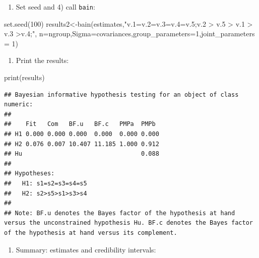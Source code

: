 \documentclass[
]{book}
\newenvironment{Shaded}{\begin{snugshade}}{\end{snugshade}}
\newcommand{\AttributeTok}[1]{\textcolor[rgb]{0.77,0.63,0.00}{#1}}
\newcommand{\DecValTok}[1]{\textcolor[rgb]{0.00,0.00,0.81}{#1}}
\newcommand{\FunctionTok}[1]{\textcolor[rgb]{0.00,0.00,0.00}{#1}}
\newcommand{\NormalTok}[1]{#1}
\newcommand{\OtherTok}[1]{\textcolor[rgb]{0.56,0.35,0.01}{#1}}
\newcommand{\StringTok}[1]{\textcolor[rgb]{0.31,0.60,0.02}{#1}}
\providecommand{\tightlist}{%
  \setlength{\itemsep}{0pt}\setlength{\parskip}{0pt}}
\begin{document}
\begin{enumerate}
\def\labelenumi{\arabic{enumi})}
\setcounter{enumi}{2}
\tightlist
\item
  Set seed and 4) call \texttt{bain}:
\end{enumerate}

\begin{Shaded}
\begin{Highlighting}[]
\FunctionTok{set.seed}\NormalTok{(}\DecValTok{100}\NormalTok{)}
\NormalTok{results2}\OtherTok{\textless{}{-}}\FunctionTok{bain}\NormalTok{(estimates,}\StringTok{"v.1=v.2=v.3=v.4=v.5;v.2 \textgreater{} v.5 \textgreater{} v.1 \textgreater{} v.3 \textgreater{}v.4;"}\NormalTok{,}
\AttributeTok{n=}\NormalTok{ngroup,}\AttributeTok{Sigma=}\NormalTok{covariances,}\AttributeTok{group\_parameters=}\DecValTok{1}\NormalTok{,}\AttributeTok{joint\_parameters =} \DecValTok{1}\NormalTok{)}
\end{Highlighting}
\end{Shaded}

\begin{enumerate}
\def\labelenumi{\arabic{enumi})}
\setcounter{enumi}{4}
\tightlist
\item
  Print the results:
\end{enumerate}

\begin{Shaded}
\begin{Highlighting}[]
\FunctionTok{print}\NormalTok{(results)}
\end{Highlighting}
\end{Shaded}

\begin{verbatim}
## Bayesian informative hypothesis testing for an object of class numeric:
## 
##    Fit   Com   BF.u   BF.c   PMPa  PMPb 
## H1 0.000 0.000 0.000  0.000  0.000 0.000
## H2 0.076 0.007 10.407 11.185 1.000 0.912
## Hu                                 0.088
## 
## Hypotheses:
##   H1: s1=s2=s3=s4=s5
##   H2: s2>s5>s1>s3>s4
## 
## Note: BF.u denotes the Bayes factor of the hypothesis at hand versus the unconstrained hypothesis Hu. BF.c denotes the Bayes factor of the hypothesis at hand versus its complement.
\end{verbatim}

\begin{enumerate}
\def\labelenumi{\arabic{enumi})}
\setcounter{enumi}{5}
\tightlist
\item
  Summary: estimates and credibility intervals:
\end{enumerate}
\end{document}
